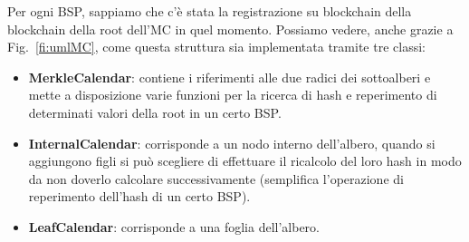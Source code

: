 Per ogni BSP, sappiamo che c'è stata la registrazione su blockchain della blockchain
della root dell'MC in quel momento.
Possiamo vedere, anche grazie a Fig.~\ref{fi:umlMC}, come questa struttura sia implementata tramite tre classi:

\begin{itemize}
    \item \textbf{MerkleCalendar}: contiene i riferimenti alle due radici dei sottoalberi e mette a disposizione varie funzioni per la ricerca di hash e reperimento di determinati valori della root in un certo BSP.
    \item \textbf{InternalCalendar}: corrisponde a un nodo interno dell’albero, quando si aggiungono figli si può scegliere di effettuare il ricalcolo del loro hash in modo da non doverlo calcolare successivamente (semplifica l’operazione di reperimento dell’hash di un certo BSP).
    \item \textbf{LeafCalendar}: corrisponde a una foglia dell’albero.
\end{itemize}


